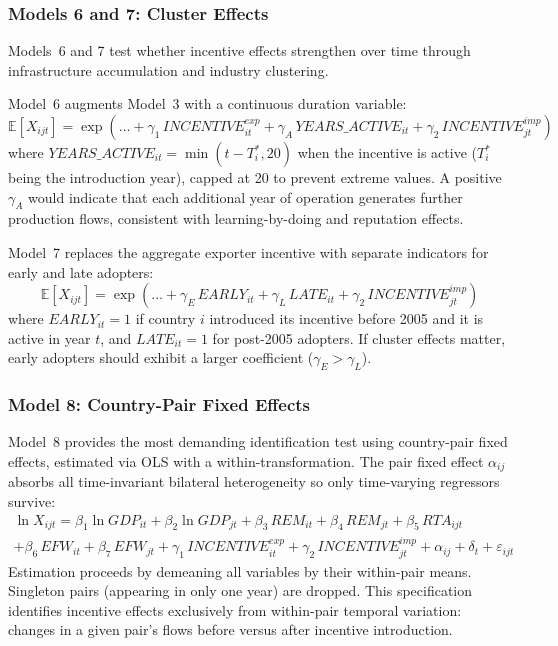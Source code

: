 \subsubsection{Models 6 and 7: Cluster Effects}

Models~6 and 7 test whether incentive effects strengthen over time through infrastructure accumulation and industry clustering.

Model~6 augments Model~3 with a continuous duration variable:
\begin{equation}
\mathbb{E}[X_{ijt}] = \exp\left(\ldots + \gamma_1\, INCENTIVE_{it}^{exp} + \gamma_A\, YEARS\_ACTIVE_{it} + \gamma_2\, INCENTIVE_{jt}^{imp}\right)
\label{eq:model6}
\end{equation}
where $YEARS\_ACTIVE_{it} = \min(t - T_i^*, 20)$ when the incentive is active ($T_i^*$ being the introduction year), capped at 20 to prevent extreme values. A positive $\gamma_A$ would indicate that each additional year of operation generates further production flows, consistent with learning-by-doing and reputation effects.

Model~7 replaces the aggregate exporter incentive with separate indicators for early and late adopters:
\begin{equation}
\mathbb{E}[X_{ijt}] = \exp\left(\ldots + \gamma_E\, EARLY_{it} + \gamma_L\, LATE_{it} + \gamma_2\, INCENTIVE_{jt}^{imp}\right)
\label{eq:model7}
\end{equation}
where $EARLY_{it} = 1$ if country $i$ introduced its incentive before 2005 and it is active in year $t$, and $LATE_{it} = 1$ for post-2005 adopters. If cluster effects matter, early adopters should exhibit a larger coefficient ($\gamma_E > \gamma_L$).

\subsubsection{Model 8: Country-Pair Fixed Effects}

Model~8 provides the most demanding identification test using country-pair fixed effects, estimated via OLS with a within-transformation. The pair fixed effect $\alpha_{ij}$ absorbs all time-invariant bilateral heterogeneity so only time-varying regressors survive:
\begin{multline}
\ln X_{ijt} = \beta_1 \ln GDP_{it} + \beta_2 \ln GDP_{jt} + \beta_3\, REM_{it} + \beta_4\, REM_{jt} + \beta_5\, RTA_{ijt} \\
+ \beta_6\, EFW_{it} + \beta_7\, EFW_{jt} + \gamma_1\, INCENTIVE_{it}^{exp} + \gamma_2\, INCENTIVE_{jt}^{imp} + \alpha_{ij} + \delta_t + \varepsilon_{ijt}
\label{eq:model8}
\end{multline}
Estimation proceeds by demeaning all variables by their within-pair means. Singleton pairs (appearing in only one year) are dropped. This specification identifies incentive effects exclusively from within-pair temporal variation: changes in a given pair's flows before versus after incentive introduction.


